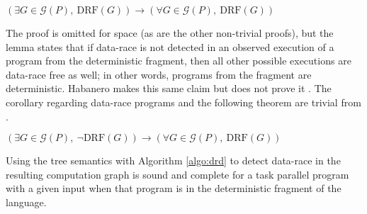 \begin{lemma} 
\label{lem:drf}
 $(\exists G \in \mathcal{G}( P ),\ \mathrm{DRF}( G )) \rightarrow (\forall G \in \mathcal{G}( P ),\ \mathrm{DRF}( G ))$ 
\end{lemma}

The proof is omitted for space (as are the other non-trivial proofs), but the lemma states that if data-race is not detected in an observed execution of a program from the deterministic fragment, then all other possible executions are data-race free as well; in other words, programs from the fragment are deterministic.
Habanero makes this same claim but does not prove it \cite{cave2011habanero}. The corollary regarding data-race programs and the following theorem are trivial from .

\begin{corollary}\label{cor:drf}
$(\exists G \in \mathcal{G}( P ),\ \neg\mathrm{DRF}( G )) \rightarrow (\forall G \in \mathcal{G}( P ),\ \mathrm{DRF}( G ))$ 
\end{corollary}

\begin{theorem} \label{thm:strcutured-par-progs}
Using the tree semantics with Algorithm \ref{algo:drd} to detect data-race in the resulting computation graph is sound and complete for a task parallel program with a given input when that program is in the deterministic fragment of the language.
\end{theorem}
